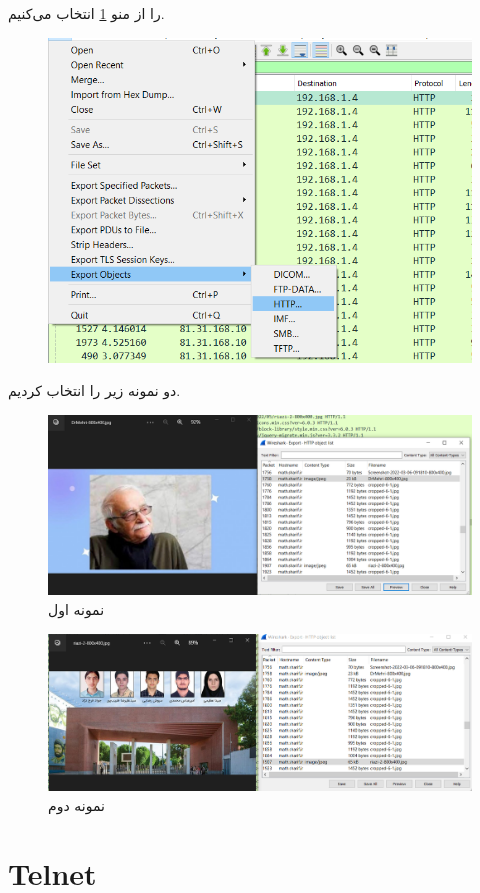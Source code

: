 \documentclass{perassignments}
\begin{document}
\begin{enumerate}
		را از منو 
		\ref{fig:1e}
		 انتخاب می‌کنیم.
		 \begin{figure}[H]
		 	\centering
		 	\includegraphics[width= 0.7\linewidth]{graphics/1e.png}
		 	\caption{}
		 	\label{fig:1e}
		 \end{figure}
	 	دو نمونه زیر را انتخاب کردیم.
	 	 \begin{figure}[H]
	 		\centering
	 		\includegraphics[width= 0.7\linewidth]{graphics/1f.png}
	 		\caption{نمونه اول}
	 		\label{fig:1f}
	 	\end{figure}
 	 \begin{figure}[H]
 		\centering
 		\includegraphics[width= 0.7\linewidth]{graphics/1g.png}
 		\caption{نمونه دوم}
 		\label{fig:1g}
 	\end{figure}
	\end{enumerate}
	\section{Telnet}
	
\end{document}
